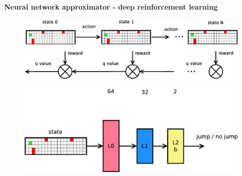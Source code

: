 \documentclass[xcolor=dvipsnames]{beamer}
\begin{document}
\begin{frame}{\bf Neural network approximator - deep reinforcement learning}

\begin{figure}[htbp]
  \centering
  \includegraphics[scale=0.3]{../../diagrams/rl_nn_learn.png}
\end{figure}


\begin{figure}[htbp]
  \centering
  \includegraphics[scale=0.3]{../../diagrams/fnn.png}
\end{figure}

\end{frame}
\end{document}
